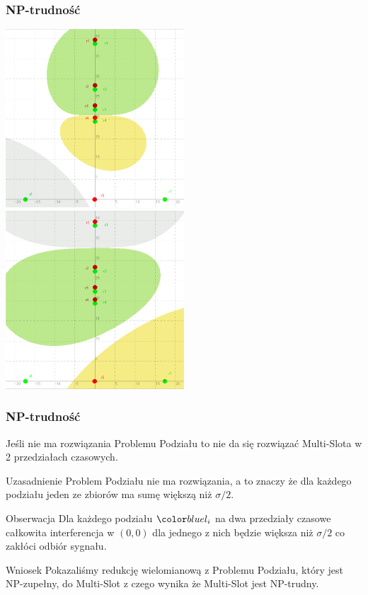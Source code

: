 \documentclass[polish, t,10pt]{beamer}
\begin{document}
\begin{frame}
    \frametitle{NP-trudność}
    \centering
    \includegraphics[width=0.5\textwidth]{pictures/np-error1.png}
    \includegraphics[width=0.5\textwidth]{pictures/np-error2.png}
\end{frame}
\begin{frame}
    \frametitle{NP-trudność}
    Jeśli nie ma rozwiązania Problemu Podziału to nie da się rozwiązać Multi-Slota w 2 przedziałach czasowych.
    \begin{block}{Uzasadnienie}
        Problem Podziału nie ma rozwiązania, a to znaczy że dla każdego podziału jeden ze zbiorów ma sumę większą niż $\sigma/2$.
    \end{block}
    \begin{block}{Obserwacja}
        Dla każdego podziału $\li$ na dwa przedziały czasowe całkowita interferencja w $(0, 0)$ dla jednego z nich będzie większa niż $\sigma/2$ co zakłóci odbiór sygnału.
    \end{block}
    \pause
    \begin{block}{Wniosek}
        Pokazaliśmy redukcję wielomianową z Problemu Podziału, który jest NP-zupełny, do Multi-Slot z czego wynika że Multi-Slot jest NP-trudny.
    \end{block}
\end{frame}
\end{document}
